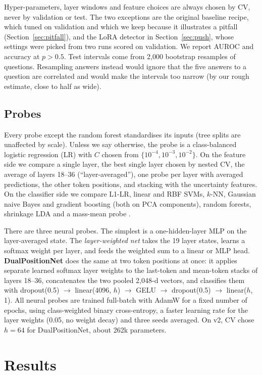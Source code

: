 \documentclass[11pt]{article}
\begin{document}
Hyper-parameters, layer windows and feature choices are always chosen by CV, never by validation or test. The two exceptions are the original baseline recipe, which tuned on validation and which we keep because it illustrates a pitfall (Section~\ref{sec:pitfall}), and the LoRA detector in Section~\ref{sec:push}, whose settings were picked from two runs scored on validation. We report AUROC and accuracy at $p>0.5$. Test intervals come from 2,000 bootstrap resamples of questions. Resampling answers instead would ignore that the five answers to a question are correlated and would make the intervals too narrow (by our rough estimate, close to half as wide).

\subsection{Probes}
Every probe except the random forest standardises its inputs (tree splits are unaffected by scale). Unless we say otherwise, the probe is a class-balanced logistic regression (LR) with $C$ chosen from $\{10^{-4},10^{-3},10^{-2}\}$. On the feature side we compare a single layer, the best single layer chosen by nested CV, the average of layers 18--36 (``layer-averaged''), one probe per layer with averaged predictions, the other token positions, and stacking with the uncertainty features. On the classifier side we compare L1-LR, linear and RBF SVMs, $k$-NN, Gaussian naive Bayes and gradient boosting (both on PCA components), random forests, shrinkage LDA and a mass-mean probe \citep{marks2023geometry}.

There are three neural probes. The simplest is a one-hidden-layer MLP on the layer-averaged state. The \emph{layer-weighted net} takes the 19 layer states, learns a softmax weight per layer, and feeds the weighted sum to a linear or MLP head. \textbf{DualPositionNet} does the same at two token positions at once: it applies separate learned softmax layer weights to the last-token and mean-token stacks of layers 18--36, concatenates the two pooled 2,048-d vectors, and classifies them with dropout(0.5) $\to$ linear(4096, $h$) $\to$ GELU $\to$ dropout(0.5) $\to$ linear($h$, 1). All neural probes are trained full-batch with AdamW for a fixed number of epochs, using class-weighted binary cross-entropy, a faster learning rate for the layer weights (0.05, no weight decay) and three seeds averaged. On v2, CV chose $h=64$ for DualPositionNet, about 262k parameters.

\section{Results}
\end{document}
